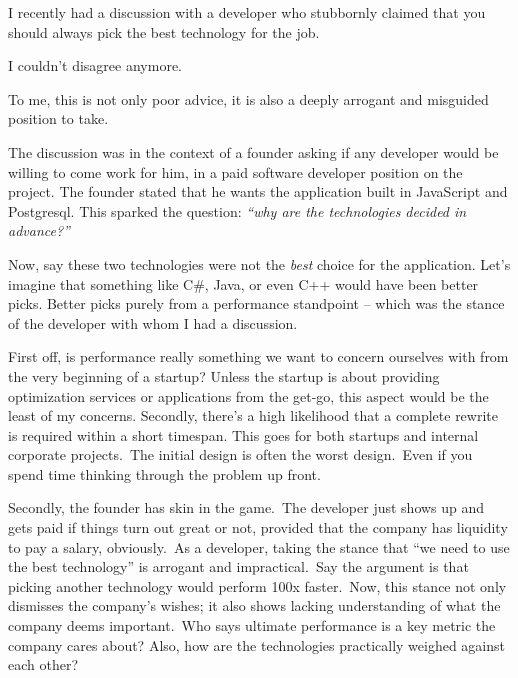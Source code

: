 \documentclass{article}
\title{\sffamily{Don't Pick the Best Technology for the Job}}
\author{
    \sffamily Nicklas Millard \\
    \sffamily Principal Software Engineer \\
    \texttt{nicklas@mjukvare.com}
}
\begin{document}
    \maketitle
    
    I recently had a discussion with a developer who stubbornly claimed that you should always pick the 
    best technology for the job.

    I couldn't disagree anymore.
    
    To me, this is not only poor advice, it is also a deeply arrogant and misguided position to take.

    The discussion was in the context of a founder asking if any developer would be willing to come work for him, in a paid
    software developer position on the project.
    The founder stated that he wants the application built in JavaScript and Postgresql. This sparked the 
    question: \textit{``why are the technologies decided in advance?''}
    
    Now, say these two technologies were not the \textit{best} choice for the application. 
    Let's imagine that something like C\#, Java, or even C++ would have been better picks. 
    Better picks purely from a performance standpoint – which was the stance of the developer with whom I had a discussion.
    
    First off, is performance really something we want to concern ourselves with from the very beginning of a startup?
    Unless the startup is about providing optimization services or applications from the get-go, this aspect would 
    be the least of my concerns.
    Secondly, there's a high likelihood that a complete rewrite is required within a short timespan. 
    This goes for both startups and internal corporate projects.\ The initial design is often the worst design.\ Even if you
    spend time thinking through the problem up front.
    
    Secondly, the founder has skin in the game.\ The developer just shows up and gets paid if things turn out great or not,
    provided that the company has liquidity to pay a salary, obviously.\ As a developer, taking the stance that 
    ``we need to use the best technology'' is arrogant and impractical.\ Say the argument is that picking another technology
    would perform 100x faster.\ Now, this stance not only dismisses the company's wishes; it also shows lacking
    understanding of what the company deems important.\ Who says ultimate performance is a key metric the company cares
    about? Also, how are the technologies practically weighed against each other?
    
\end{document}
